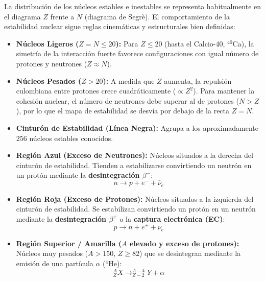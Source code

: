 La distribución de los núcleos estables e inestables se representa habitualmente en el diagrama $Z$ frente a $N$ (diagrama de Segrè). El comportamiento de la estabilidad nuclear sigue reglas cinemáticas y estructurales bien definidas:

\begin{concepto}
\begin{itemize}
    \item \textbf{Núcleos Ligeros ($Z = N \le 20$):} Para $Z \le 20$ (hasta el Calcio-40, $^{40}\text{Ca}$), la simetría de la interacción fuerte favorece configuraciones con igual número de protones y neutrones ($Z \approx N$).
    \item \textbf{Núcleos Pesados ($Z > 20$):} A medida que $Z$ aumenta, la repulsión culombiana entre protones crece cuadráticamente ($\propto Z^2$). Para mantener la cohesión nuclear, el número de neutrones debe superar al de protones ($N > Z$), por lo que el mapa de estabilidad se desvía por debajo de la recta $Z = N$.
    \item \textbf{Cinturón de Estabilidad (Línea Negra):} Agrupa a los aproximadamente $256$ núcleos estables conocidos.
    \item \textbf{Región Azul (Exceso de Neutrones):} Núcleos situados a la derecha del cinturón de estabilidad. Tienden a estabilizarse convirtiendo un neutrón en un protón mediante la \textbf{desintegración $\beta^-$}:
    \begin{equation}
    n \longrightarrow p + e^- + \bar{\nu}_e
    \end{equation}
    \item \textbf{Región Roja (Exceso de Protones):} Núcleos situados a la izquierda del cinturón de estabilidad. Se estabilizan convirtiendo un protón en un neutrón mediante la \textbf{desintegración $\beta^+$} o la \textbf{captura electrónica (EC)}:
    \begin{equation}
    p \longrightarrow n + e^+ + \nu_e
    \end{equation}
    \item \textbf{Región Superior / Amarilla ($A$ elevado y exceso de protones):} Núcleos muy pesados ($A > 150$, $Z \ge 82$) que se desintegran mediante la emisión de una partícula $\alpha$ ($^4\text{He}$):
    \begin{equation}
    ^A_Z X \longrightarrow ^{A-4}_{Z-2} Y + \alpha
    \end{equation}
\end{itemize}
\end{concepto}

